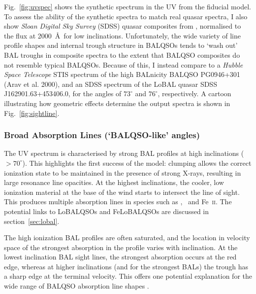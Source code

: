\noindent
Fig.~\ref{fig:uvspec} shows the synthetic spectrum in the UV from the fiducial model. 
To assess the ability of the synthetic spectra to match real 
quasar spectra, I also show {\sl Sloan Digital Sky Survey} (SDSS) quasar
composites from \cite{reichard2003}, normalised to the flux at 2000~\AA\
for low inclinations. Unfortunately, the wide variety of
line profile shapes and internal trough structure in BALQSOs
tends to `wash out' BAL troughs in composite spectra
to the extent that BALQSO composites do not resemble typical BALQSOs.
Because of this, I instead compare to a {\sl Hubble Space Telescope} 
STIS spectrum of the high BALnicity BALQSO PG0946+301 (Arav et al. 2000),\index{PG0946+301}
and an SDSS spectrum of the LoBAL quasar SDSS J162901.63+453406.0,
for the angles of $73^\circ$ and $76^\circ$, respectively. 
A cartoon illustrating how geometric effects determine
the output spectra is shown in Fig.~\ref{fig:sightline}.  

\subsubsection{Broad Absorption Lines (`BALQSO-like' angles)}
\label{sec:balqso_angles}

The UV spectrum is characterised by strong BAL 
profiles at high inclinations ($> 70^\circ$). 
This highlights the first success of the model: 
clumping allows the correct ionization state 
to be maintained in the presence of strong X-rays, 
resulting in large resonance line opacities. 
At the highest inclinations, the 
cooler, low ionization material at the base of the wind
starts to intersect the line of sight. This produces 
multiple absorption lines in species such as \mg,
\al\ and Fe~\textsc{ii}. The potential links to LoBALQSOs and 
FeLoBALQSOs are discussed in section~\ref{sec:lobal}.

The high ionization BAL profiles are often saturated, and the location in velocity space
of the strongest absorption in the profile varies with inclination.
At the lowest inclination BAL sight lines, the strongest absorption occurs at the red edge,
whereas at higher inclinations (and for the strongest BALs)
the trough has a sharp edge at the terminal velocity.
This offers one potential explanation for the wide range of BALQSO absorption
line shapes \citep[see e.g.][]{trump2006,knigge2008,filizak2014}.
\index{absorption line}

